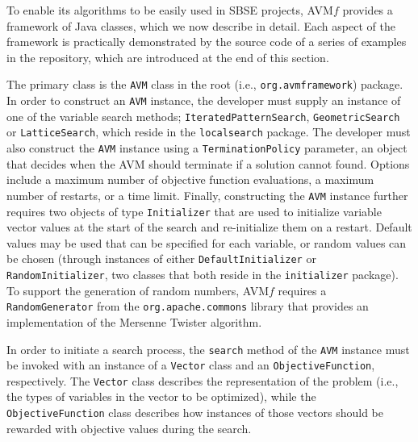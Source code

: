 \documentclass{llncs}
\newcommand{\name}{AVM\hspace{-1pt}$f$\xspace}
\newcommand{\inlineheading}[1]{\vspace{1mm} \noindent {\bf #1.}}
\begin{document}
To enable its algorithms to be easily used in SBSE projects, \name provides a framework of Java classes, which we now describe in detail. Each aspect of the framework is practically demonstrated by the source code of a series of examples in the repository, which are introduced at the end of this section.

\begin{sloppypar}
\inlineheading{Configuring an AVM search} The primary class is the {\tt AVM} class in the root (i.e., {\tt org.avmframework}) package. In order to construct an {\tt AVM} instance, the developer must supply an instance of one of the variable search methods; {\tt IteratedPatternSearch}, {\tt GeometricSearch} or {\tt LatticeSearch}, which reside in the {\tt localsearch} package. The developer must also construct the {\tt AVM} instance using a {\tt TerminationPolicy} parameter, an object that decides when the AVM should terminate if a solution cannot found. Options include a maximum number of objective function evaluations, a maximum number of restarts, or a time limit. Finally, constructing the {\tt AVM} instance further requires two objects of type {\tt Initializer} that are used to initialize variable vector values at the start of the search and re-initialize them on a restart. Default values may be used that can be specified for each variable, or random values can be chosen (through instances of either {\tt DefaultInitializer} or {\tt RandomInitializer}, two classes that both reside in the {\tt initializer} package). To support the generation of random numbers, \name requires a {\tt RandomGenerator} from the {\tt org.apache.commons} library that provides an implementation of the Mersenne Twister algorithm.
\end{sloppypar}

\begin{sloppypar}
In order to initiate a search process, the {\tt search} method of the {\tt AVM} instance must be invoked with an instance of a {\tt Vector} class and an {\tt ObjectiveFunction}, respectively. The {\tt Vector} class describes the representation of the problem
(i.e., the types of variables in the vector to be optimized), while the {\tt ObjectiveFunction} class describes how instances of those vectors should be rewarded with objective values during the search.
\end{sloppypar}
\end{document}
